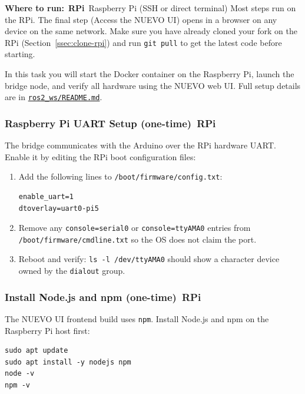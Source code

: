 \documentclass{ol-softwaremanual}
\newcommand{\onrpi}{%
  \,\colorbox{blue!20}{\footnotesize\sffamily\bfseries RPi}}
\newcommand{\machinebox}[2]{%
  \par\noindent
  \colorbox{gray!12}{\parbox{\dimexpr\linewidth-2\fboxsep}{%
    \small\sffamily\textbf{Where to run:} #1 \quad\textbar\quad #2}}%
  \par\smallskip}
\newcommand{\doclink}[2]{\href{#1}{#2}}
\begin{document}
\machinebox{\onrpi\ Raspberry Pi (SSH or direct terminal)}{Most steps run on the RPi. The final step (Access the NUEVO UI) opens in a browser on any device on the same network. Make sure you have already cloned your fork on the RPi (Section~\ref{ssec:clone-rpi}) and run \texttt{git pull} to get the latest code before starting.}

In this task you will start the Docker container on the Raspberry Pi, launch the
bridge node, and verify all hardware using the NUEVO web UI.
Full setup details are in
\doclink{https://github.com/pochihh/Project-NUEVO/blob/main/ros2_ws/README.md}{\texttt{ros2\_ws/README.md}}.

\subsubsection{Raspberry Pi UART Setup (one-time)\onrpi}

The bridge communicates with the Arduino over the RPi hardware UART.
Enable it by editing the RPi boot configuration files:

\begin{enumerate}
  \item Add the following lines to \texttt{/boot/firmware/config.txt}:
\begin{verbatim}
enable_uart=1
dtoverlay=uart0-pi5
\end{verbatim}

  \item Remove any \texttt{console=serial0} or \texttt{console=ttyAMA0} entries
        from \texttt{/boot/firmware/cmdline.txt} so the OS does not claim the port.

  \item Reboot and verify: \texttt{ls -l /dev/ttyAMA0} should show a character
        device owned by the \texttt{dialout} group.
\end{enumerate}

\subsubsection{Install Node.js and npm (one-time)\onrpi}

The NUEVO UI frontend build uses \texttt{npm}. Install Node.js and npm on the
Raspberry Pi host first:

\begin{verbatim}
sudo apt update
sudo apt install -y nodejs npm
node -v
npm -v
\end{verbatim}
\end{document}
